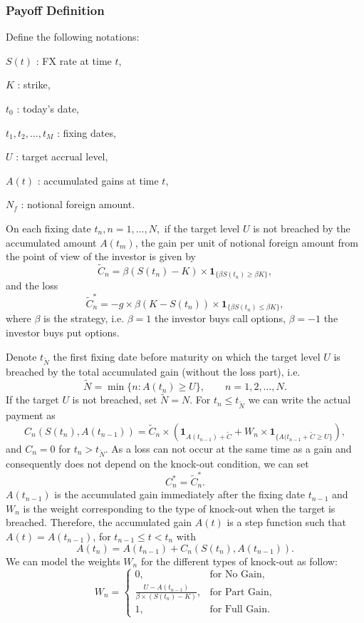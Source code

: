 \subsubsection*{Payoff Definition}
\label{sec:intro:Payoff}
Define the following notations:
\begin{my_list_item}
\item $S(t)$ : FX rate at time $t$,
\item $K$ : strike,
\item $t_0$ : today's date,
\item $t_1,t_2,\ldots,t_M$ : fixing dates,
\item $U$ : target accrual level,
\item $A(t)$ : accumulated gains at time $t$,
\item $N_f$ : notional foreign amount.
\end{my_list_item}

On each fixing date $t_n, n = 1,\ldots,N,$ if the target level $U$ is not breached by the accumulated amount $A(t_m)$, the gain per unit of notional foreign amount from the point of view of the investor is given by
\[\tilde{C}_n = \beta(S(t_n)-K)\times \mathbf{1}_{\{\beta S(t_n)\geq \beta K\}}, \]
and the loss
\[\tilde{C}_n^\ast = -g \times \beta(K-S(t_n))\times \mathbf{1}_{\{\beta S(t_n)\leq \beta K\}}, \]
where $\beta$ is the strategy, i.e. $\beta = 1$ the investor buys call options, $\beta = -1$ the investor buys put options.

Denote $t_{\tilde{N}}$ the first fixing date before maturity on which the target level $U$ is breached by the total accumulated gain (without the loss part), i.e.
\[\tilde{N}=\min\{n: A(t_n)\geq U\},\qquad n = 1,2,\ldots,N.\]
If the target $U$ is not breached, set $\tilde{N} = N$. For $t_n \leq t_{\tilde{N}}$ we can write the actual payment as
\[C_n(S(t_n),A(t_{n-1})) = \tilde{C}_n\times (\mathbf{1}_{A(t_{n-1})+\tilde{C}}+W_n\times\mathbf{1}_{\{A(t_{n-1}+\tilde{C}\geq U\}}),\]
and $C_n=0$ for $t_n>t_{\tilde{N}}$. As a loss can not occur at the same time as a gain and consequently does not depend on the knock-out condition, we can set
\[C^\ast_n = \tilde{C}_n^\ast.\]
$A(t_{n-1})$ is the accumulated gain immediately after the fixing date $t_{n-1}$ and $W_n$ is the weight corresponding to the type of knock-out when the target is breached. Therefore, the accumulated gain $A(t)$ is a step function such that $A(t) = A(t_{n-1})$, for $t_{n-1}\leq t < t_n$ with
\[A(t_n)= A(t_{n-1}) + C_n(S(t_n),A(t_{n-1})).\]
We can model the weights $W_n$ for the different types of knock-out as follow:
\[W_n = \begin{cases}
0, &\text{for No Gain,} \\
\frac{U-A(t_{n-1})}{\beta\times(S(t_n)-K)}, & \text{for Part Gain,}\\
1, &\text{for Full Gain.}
\end{cases}\]

